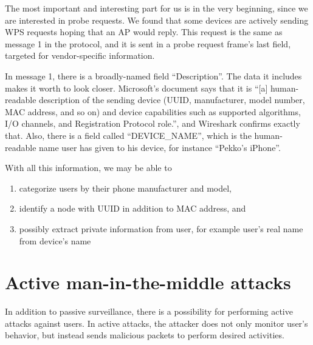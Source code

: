 \documentclass[12pt,a4paper,oneside,pdftex]{report}
\begin{document}
The most important and interesting part for us is in the very beginning, since we are interested in probe requests. We found that some devices are actively sending WPS requests hoping that an AP would reply. This request is the same as message 1 in the protocol, and it is sent in a probe request frame's last field, targeted for vendor-specific information.

In message 1, there is a broadly-named field ``Description''. The data it includes makes it worth to look closer. Microsoft's document says that it is ``[a] human-readable description of the sending device (UUID, manufacturer, model number, MAC address, and so on) and device capabilities such as supported algorithms, I/O channels, and Registration Protocol role.'', and Wireshark confirms exactly that. Also, there is a field called ``DEVICE\_NAME'', which is the human-readable name user has given to his device, for instance ``Pekko's iPhone''.

With all this information, we may be able to
\begin{enumerate}
    \item categorize users by their phone manufacturer and model,
    \item identify a node with UUID in addition to MAC address, and
    \item possibly extract private information from user, for example user's real name from device's name
\end{enumerate}






\chapter{Active man-in-the-middle attacks}
\label{chapter:attacks}

In addition to passive surveillance, there is a possibility for performing active attacks against users. In active attacks, the attacker does not only monitor user's behavior, but instead sends malicious packets to perform desired activities. 
\end{document}
